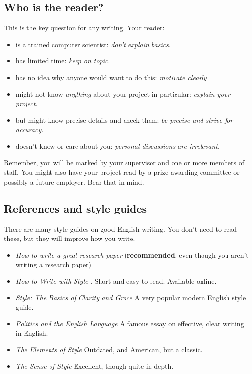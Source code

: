 \documentclass{l4proj}
\begin{document}
\subsection{Who is the reader?}

This is the key question for any writing. Your reader:

\begin{itemize}
    \item
    is a trained computer scientist: \emph{don't explain basics}.
    \item
    has limited time: \emph{keep on topic}.
    \item
    has no idea why anyone would want to do this: \emph{motivate clearly}
    \item
    might not know \emph{anything} about your project in particular:
    \emph{explain your project}.
    \item
    but might know precise details and check them: \emph{be precise and
    strive for accuracy.}
    \item
    doesn't know or care about you: \emph{personal discussions are
    irrelevant}.
\end{itemize}

Remember, you will be marked by your supervisor and one or more members
of staff. You might also have your project read by a prize-awarding
committee or possibly a future employer. Bear that in mind.

\subsection{References and style guides}
There are many style guides on good English writing. You don't need to
read these, but they will improve how you write.

\begin{itemize}
    \item
    \emph{How to write a great research paper} \cite{Pey17} (\textbf{recommended}, even though you aren't writing a research paper)
    \item
    \emph{How to Write with Style} \cite{Von80}. Short and easy to read. Available online.
    \item
    \emph{Style: The Basics of Clarity and Grace} \cite{Wil09} A very popular modern English style guide.
    \item
    \emph{Politics and the English Language} \cite{Orw68}  A famous essay on effective, clear writing in English.
    \item
    \emph{The Elements of Style} \cite{StrWhi07} Outdated, and American, but a classic.
    \item
    \emph{The Sense of Style} \cite{Pin15} Excellent, though quite in-depth.
\end{itemize}
\end{document}
